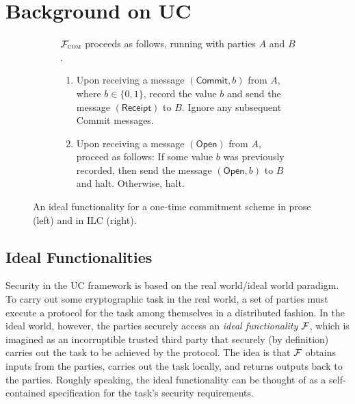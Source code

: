 \section{Background on UC}
\label{sec:background}

\begin{figure}
\begin{subfigure}{.6\textwidth}
\begin{func}
    $\mathcal{{F}}_{\textsc{com}}$ proceeds as follows, running with parties $A$ and
  $B$.
    \begin{enumerate}
        \item Upon receiving a message $(\mathsf{Commit}, b)$ from $A$, where $b
          \in \{ 0, 1 \}$, record the value $b$ and send the message
          $(\mathsf{Receipt})$ to $B$. Ignore any subsequent \textsf{Commit}
          messages.
        \item Upon receiving a message $(\mathsf{Open})$ from $A$, proceed as
          follows: If some value $b$ was previously recorded, then send the
          message $(\mathsf{Open}, b)$ to $B$ and halt. Otherwise, halt.
    \end{enumerate}
\end{func}
\label{func:com}
\end{subfigure}\hspace{.04\textwidth}%
\begin{subfigure}{.35\textwidth}
  
\end{subfigure}
\caption{An ideal functionality for a one-time commitment scheme in prose (left)
  and in ILC (right).}
\label{func:com}
\end{figure}

\subsection{Ideal Functionalities}
\label{subsec:functionalities}

Security in the UC framework is based on the real world/ideal world paradigm. To
carry out some cryptographic task in the real world, a set of parties must
execute a protocol for the task among themselves in a distributed fashion. In
the ideal world, however, the parties securely access an \emph{ideal
  functionality} $\mathcal{{F}}$, which is imagined as an incorruptible trusted third
party that securely (by definition) carries out the task to be achieved by the
protocol. The idea is that $\mathcal{{F}}$ obtains inputs from the parties, carries out
the task locally, and returns outputs back to the parties. Roughly speaking, the
ideal functionality can be thought of as a self-contained specification for the
task's security requirements.

